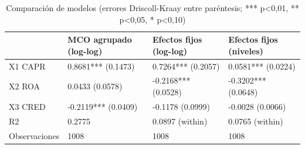 \begin{table}[htbp]
\centering
\caption{Comparación de modelos (errores Driscoll-Kraay entre paréntesis; *** p<0,01, ** p<0,05, * p<0,10)}
\begin{tabular}{llll}
\hline
 & MCO agrupado (log-log) & Efectos fijos (log-log) & Efectos fijos (niveles) \\
\hline
X1 CAPR & 0.8681*** (0.1473) & 0.7264*** (0.2057) & 0.0581*** (0.0224) \\
X2 ROA & 0.0433 (0.0578) & -0.2168*** (0.0528) & -0.3202*** (0.0648) \\
X3 CRED & -0.2119*** (0.0409) & -0.1178 (0.0999) & -0.0028 (0.0066) \\
R2 & 0.2775 & 0.0897 (within) & 0.0765 (within) \\
Observaciones & 1008 & 1008 & 1008 \\
\hline
\end{tabular}
\label{tab:tabla5_comparacion_modelos}
\end{table}